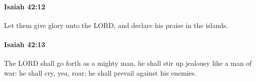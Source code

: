 		\paragraph{Isaiah 42:12} %
			\label{ISAIAH-42-12}

			Let them give glory unto the LORD, and declare his praise in the islands.


		\paragraph{Isaiah 42:13} %
			\label{ISAIAH-42-13}

			The LORD shall go forth as a mighty man, he shall stir up jealousy like a man of war: he shall cry, yea, roar; he shall prevail against his enemies.


